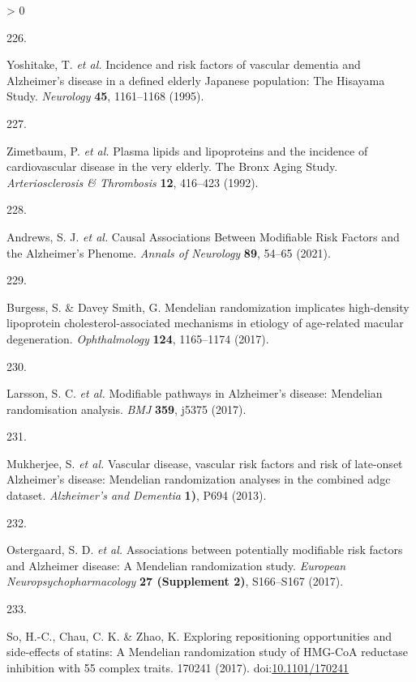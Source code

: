 \documentclass[a4paper, twoside]{templates/ociamthesis}
\newlength{\cslhangindent}
\newlength{\csllabelwidth}
\newenvironment{CSLReferences}[3] %
 {%
  \setlength{\parindent}{0pt}
  \ifodd #1 \everypar{\setlength{\hangindent}{\cslhangindent}}\ignorespaces\fi
  \ifnum #2 > 0
  \setlength{\parskip}{#2\baselineskip}
  \fi
 }%
 {}
\newcommand{\CSLLeftMargin}[1]{\parbox[t]{\maxof{\widthof{#1}}{\csllabelwidth}}{#1}}
\newcommand{\CSLRightInline}[1]{\parbox[t]{\linewidth - \csllabelwidth}{#1}}
\begin{document}
\begin{CSLReferences}{0}{0}
\leavevmode\hypertarget{ref-yoshitake1995}{}%
\CSLLeftMargin{226. }
\CSLRightInline{Yoshitake, T. \emph{et al.} Incidence and risk factors of vascular dementia and {Alzheimer}'s disease in a defined elderly {Japanese} population: The {Hisayama Study}. \emph{Neurology} \textbf{45}, 1161--1168 (1995).}

\leavevmode\hypertarget{ref-zimetbaum1992}{}%
\CSLLeftMargin{227. }
\CSLRightInline{Zimetbaum, P. \emph{et al.} Plasma lipids and lipoproteins and the incidence of cardiovascular disease in the very elderly. {The Bronx Aging Study}. \emph{Arteriosclerosis \& Thrombosis} \textbf{12}, 416--423 (1992).}

\leavevmode\hypertarget{ref-andrews2021}{}%
\CSLLeftMargin{228. }
\CSLRightInline{Andrews, S. J. \emph{et al.} Causal {Associations Between Modifiable Risk Factors} and the {Alzheimer}'s {Phenome}. \emph{Annals of Neurology} \textbf{89}, 54--65 (2021).}

\leavevmode\hypertarget{ref-burgess2017}{}%
\CSLLeftMargin{229. }
\CSLRightInline{Burgess, S. \& Davey Smith, G. Mendelian randomization implicates high-density lipoprotein cholesterol-associated mechanisms in etiology of age-related macular degeneration. \emph{Ophthalmology} \textbf{124}, 1165--1174 (2017).}

\leavevmode\hypertarget{ref-larsson2017a}{}%
\CSLLeftMargin{230. }
\CSLRightInline{Larsson, S. C. \emph{et al.} Modifiable pathways in {Alzheimer}'s disease: Mendelian randomisation analysis. \emph{BMJ} \textbf{359}, j5375 (2017).}

\leavevmode\hypertarget{ref-mukherjee2013}{}%
\CSLLeftMargin{231. }
\CSLRightInline{Mukherjee, S. \emph{et al.} Vascular disease, vascular risk factors and risk of late-onset {Alzheimer}'s disease: Mendelian randomization analyses in the combined adgc dataset. \emph{Alzheimer's and Dementia} \textbf{1)}, P694 (2013).}

\leavevmode\hypertarget{ref-ostergaard2017}{}%
\CSLLeftMargin{232. }
\CSLRightInline{Ostergaard, S. D. \emph{et al.} Associations between potentially modifiable risk factors and {Alzheimer} disease: A {Mendelian} randomization study. \emph{European Neuropsychopharmacology} \textbf{27 (Supplement 2)}, S166--S167 (2017).}

\leavevmode\hypertarget{ref-so2017}{}%
\CSLLeftMargin{233. }
\CSLRightInline{So, H.-C., Chau, C. K. \& Zhao, K. Exploring repositioning opportunities and side-effects of statins: A {Mendelian} randomization study of {HMG}-{CoA} reductase inhibition with 55 complex traits. 170241 (2017). doi:\href{https://doi.org/10.1101/170241}{10.1101/170241}}


\end{CSLReferences}
\end{document}
